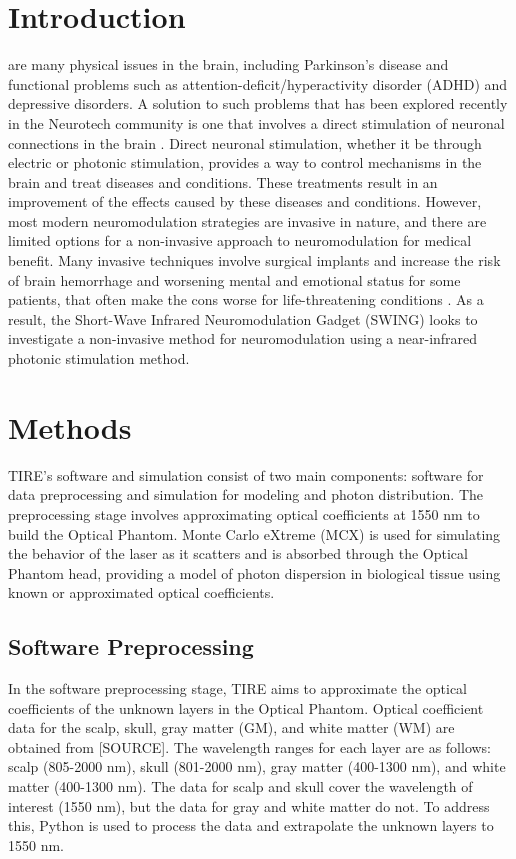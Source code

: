 \documentclass[journal,twoside,web]{ieeecolor}
\begin{document}
\section{Introduction}
\label{sec:introduction}
 are many physical issues in the brain, including Parkinson's disease and functional 
problems such as attention-deficit/hyperactivity disorder (ADHD) and depressive disorders. 
A solution to such problems that has been explored recently in the Neurotech community is one that involves a direct stimulation of  
neuronal connections in the brain \cite{b1,b2,b3}. Direct neuronal stimulation, whether it be through electric or photonic 
stimulation, provides a way to control mechanisms in the brain and treat diseases and conditions. These treatments result 
in an improvement of the effects caused by these diseases and conditions. However, most modern neuromodulation strategies 
are invasive in nature, and there are limited options for a non-invasive approach to neuromodulation for medical benefit. Many invasive 
techniques involve surgical implants and increase the risk of brain hemorrhage and worsening mental and emotional status for some patients,  
that often make the cons worse for life-threatening conditions \cite{b1,b4}. As a result, the Short-Wave Infrared Neuromodulation Gadget (SWING) 
looks to investigate a non-invasive method for neuromodulation using a near-infrared photonic stimulation method. 

\section{Methods}
\label{sec:methods}
TIRE's software and simulation consist of two main components: software for data preprocessing and simulation for modeling and photon distribution. 
The preprocessing stage involves approximating optical coefficients at 1550 nm to build the Optical Phantom. Monte Carlo eXtreme (MCX) is used for simulating the 
behavior of the laser as it scatters and is absorbed through the Optical Phantom head, providing a model of photon dispersion in biological tissue using known or 
approximated optical coefficients.

\subsection{Software Preprocessing}
In the software preprocessing stage, TIRE aims to approximate the optical coefficients of the unknown layers in the Optical Phantom. Optical coefficient data for 
the scalp, skull, gray matter (GM), and white matter (WM) are obtained from [SOURCE]. The wavelength ranges for each layer are as follows: scalp (805-2000 nm), 
skull (801-2000 nm), gray matter (400-1300 nm), and white matter (400-1300 nm). The data for scalp and skull cover the wavelength of interest (1550 nm), but the data 
for gray and white matter do not. To address this, Python is used to process the data and extrapolate the unknown layers to 1550 nm.
\end{document}
